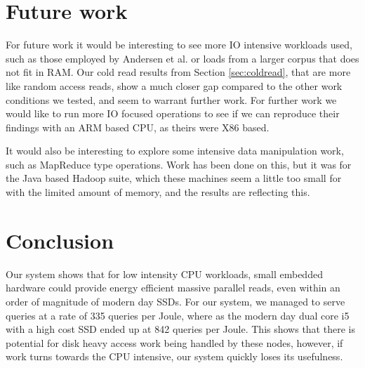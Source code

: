 
\clearpage
\section{Future work}
\label{sec:future}
For future work it would be interesting to see more IO intensive workloads used, such as those employed by Andersen et al.\cite{fawn} or loads from a larger corpus that does not fit in RAM.
Our cold read results from Section \ref{sec:coldread}, that are more like random access reads, show a much closer gap compared to the other work conditions we tested, and seem to warrant further work.
For further work we would like to run more IO focused operations to see if we can reproduce their findings with an ARM based CPU, as theirs were X86 based.

It would also be interesting to explore some intensive data manipulation work, such as MapReduce type operations.
Work has been done on this, but it was for the Java based Hadoop suite, which these machines seem a little too small for with the limited amount of memory, and the results are reflecting this.

\clearpage
\section{Conclusion}
\label{sec:conclusion}
Our system shows that for low intensity CPU workloads, small embedded hardware could provide energy efficient massive parallel reads, even within an order of magnitude of modern day SSDs.
For our system, we managed to serve queries at a rate of 335 queries per Joule, where as the modern day dual core i5 with a high cost SSD ended up at 842 queries per Joule.
This shows that there is potential for disk heavy access work being handled by these nodes, however, if work turns towards the CPU intensive, our system quickly loses its usefulness.

